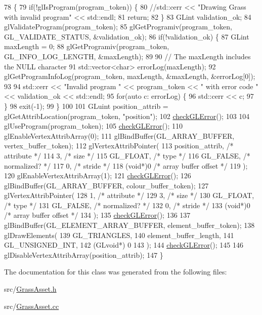 \begin{DoxyCode}
78                                           \{
79   \textcolor{keywordflow}{if}(!glIsProgram(program\_token)) \{
80     \textcolor{comment}{//std::cerr << "Drawing Grass with invalid program" << std::endl;}
81     \textcolor{keywordflow}{return};
82   \}
83   GLint validation\_ok;
84   glValidateProgram(program\_token);
85   glGetProgramiv(program\_token, GL\_VALIDATE\_STATUS, &validation\_ok);
86   \textcolor{keywordflow}{if}(!validation\_ok) \{
87     GLint maxLength = 0;
88     glGetProgramiv(program\_token, GL\_INFO\_LOG\_LENGTH, &maxLength);
89 
90     \textcolor{comment}{// The maxLength includes the NULL character}
91     std::vector<char> errorLog(maxLength);
92     glGetProgramInfoLog(program\_token, maxLength, &maxLength, &errorLog[0]);
93 
94     std::cerr << \textcolor{stringliteral}{"Invalid program "} << program\_token << \textcolor{stringliteral}{" with error code "} << validation\_ok << std::endl;
95     \textcolor{keywordflow}{for}(\textcolor{keyword}{auto} c: errorLog) \{
96       std::cerr << c;
97     \}
98     exit(-1);
99   \}
100 
101   GLuint position\_attrib = glGetAttribLocation(program\_token, \textcolor{stringliteral}{"position"});
102   \hyperlink{_grass_asset_8cc_a75f201b0e53e68726854997957322b8d}{checkGLError}();
103 
104   glUseProgram(program\_token);
105   \hyperlink{_grass_asset_8cc_a75f201b0e53e68726854997957322b8d}{checkGLError}();
110   glEnableVertexAttribArray(0);
111   glBindBuffer(GL\_ARRAY\_BUFFER, vertex\_buffer\_token);
112   glVertexAttribPointer(
113     position\_attrib,        \textcolor{comment}{/* attribute */}
114     3,        \textcolor{comment}{/* size */}
115     GL\_FLOAT,   \textcolor{comment}{/* type */}
116     GL\_FALSE,   \textcolor{comment}{/* normalized? */}
117     0,        \textcolor{comment}{/* stride */}
118     (\textcolor{keywordtype}{void}*)0    \textcolor{comment}{/* array buffer offset */}
119   );
120   glEnableVertexAttribArray(1);
121   \hyperlink{_grass_asset_8cc_a75f201b0e53e68726854997957322b8d}{checkGLError}();
126   glBindBuffer(GL\_ARRAY\_BUFFER, colour\_buffer\_token);
127   glVertexAttribPointer(
128     1,        \textcolor{comment}{/* attribute */}
129     3,        \textcolor{comment}{/* size */}
130     GL\_FLOAT,   \textcolor{comment}{/* type */}
131     GL\_FALSE,   \textcolor{comment}{/* normalized? */}
132     0,        \textcolor{comment}{/* stride */}
133     (\textcolor{keywordtype}{void}*)0    \textcolor{comment}{/* array buffer offset */}
134   );
135   \hyperlink{_grass_asset_8cc_a75f201b0e53e68726854997957322b8d}{checkGLError}();
136 
137   glBindBuffer(GL\_ELEMENT\_ARRAY\_BUFFER, element\_buffer\_token);
138   glDrawElements(
139     GL\_TRIANGLES,
140     element\_buffer\_length,
141     GL\_UNSIGNED\_INT,
142     (GLvoid*) 0
143   );
144   \hyperlink{_grass_asset_8cc_a75f201b0e53e68726854997957322b8d}{checkGLError}();
145 
146   glDisableVertexAttribArray(position\_attrib);
147 \}
\end{DoxyCode}


The documentation for this class was generated from the following files\+:\begin{DoxyCompactItemize}
\item 
src/\hyperlink{_grass_asset_8h}{Grass\+Asset.\+h}\item 
src/\hyperlink{_grass_asset_8cc}{Grass\+Asset.\+cc}\end{DoxyCompactItemize}
